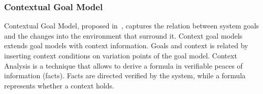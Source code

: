 
%
%

\subsubsection{Contextual Goal Model}

Contextual Goal Model, proposed in~\cite{ali_goal-based_2010}, captures the relation between system goals and the changes into the environment that surround it. Context goal models extends goal models with context information. Goals and context is related by inserting context conditions on variation points of the goal model. Context Analysis is a technique that allows to derive a formula in verifiable peaces of information (facts). Facts are directed verified by the system, while a formula represents whether a context holds.
